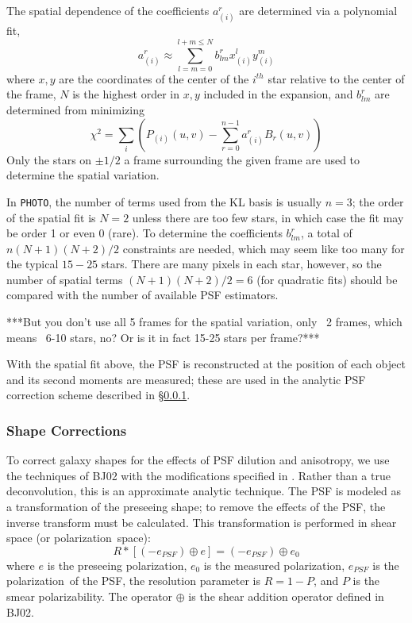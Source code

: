 \documentclass{emulateapj}
\newcommand{\photo}{\texttt{PHOTO}}
\newcommand{\polarization}{polarization}
\begin{document}
The spatial dependence of the coefficients $a_{(i)}^r$ are determined
via a polynomial fit, 
\begin{equation}
a_{(i)}^r \approx \sum_{l=m=0}^{l+m \le N} b_{lm}^r x_{(i)}^l y_{(i)}^m
\end{equation}
where $x,y$ are the coordinates of the center of the $i^{th}$ star 
relative to the center of the frame, $N$
is the highest order in $x,y$ included in the expansion, and $b_{lm}^r$ are
determined from minimizing 
\begin{equation}
\chi^2 = \sum_i\left( P_{(i)}(u,v) - \sum_{r=0}^{n-1} a_{(i)}^r B_r(u,v)\right)
\end{equation}
Only the stars on $\pm 1/2$ a frame surrounding the given frame are 
used to determine the spatial variation.

In \photo, the number of terms used from the KL basis is usually $n=3$; 
the order of the spatial fit is $N=2$ unless there are too few
stars, in which case the fit may be order 1 or even 0 (rare). To determine 
the coefficients $b_{lm}^r$, 
a total of $n(N+1)(N+2)/2$ constraints are needed, which may seem like too
many for the typical $15-25$ stars.
There are many pixels in each star, however,
so the number of spatial terms $(N+1)(N+2)/2 = 6$ (for quadratic fits) 
should be compared with the number of available PSF estimators.

***But you don't use all 5 frames for the spatial variation, only ~2 frames, 
which means ~6-10 stars, no? Or is it in fact 15-25 stars per frame?***

With the spatial fit above, 
the PSF is reconstructed at the position of each object and its second moments 
are measured; these are used in the analytic
PSF correction scheme described in \S \ref{data:imaging:correct}.

\subsubsection{Shape Corrections} \label{data:imaging:correct}

To correct galaxy shapes for the effects of
PSF dilution and anisotropy, we use the techniques of BJ02 
with the modifications specified in
\cite{Hirata02}.  Rather than a true deconvolution, this is an approximate
analytic technique. The PSF is modeled as a transformation of the preseeing
shape; to remove the effects of the PSF, the inverse transform must
be calculated.  This transformation is performed in shear space (or
\polarization\ space):
\begin{equation}
R * [ (-e_{PSF}) \oplus e ] = (-e_{PSF}) \oplus e_0
\end{equation}
where $e$ is the preseeing \polarization, $e_0$ is the measured \polarization,
$e_{PSF}$ is the \polarization\ of the PSF, the resolution
parameter is $R=1-P$, and $P$ is the smear polarizability.  The
operator $\oplus$ is the shear addition operator defined in BJ02.
\end{document}
